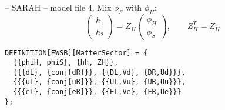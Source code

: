 \documentclass[11pt]{beamer}
\begin{document}
\begin{frame}[fragile]{\insertsection -- SARAH -- model file}
  4. Mix $\phi_S$ with $\phi_H$:
  \begin{equation*}
    \begin{pmatrix}
      h_1 \\ h_2
    \end{pmatrix}
    =
    Z_H
    \begin{pmatrix}
      \phi_H \\ \phi_S
    \end{pmatrix},
    \qquad
    Z_H^T = Z_H
  \end{equation*}
  \begin{lstlisting}
DEFINITION[EWSB][MatterSector] = {
  {{phiH, phiS}, {hh, ZH}},
  {{{dL}, {conj[dR]}}, {{DL,Vd}, {DR,Ud}}},
  {{{uL}, {conj[uR]}}, {{UL,Vu}, {UR,Uu}}},
  {{{eL}, {conj[eR]}}, {{EL,Ve}, {ER,Ue}}}
};\end{lstlisting}
\end{frame}


\end{document}
